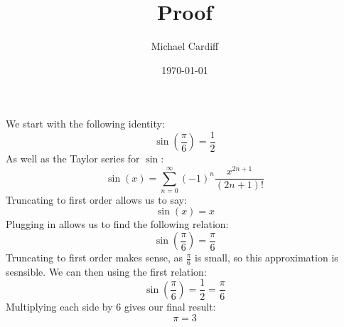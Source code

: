 \documentclass[12pt]{article}
\title{Proof}
\author{Michael Cardiff}
\date{\today}
\begin{document}
\maketitle
We start with the following identity:
\begin{equation}
  \sin(\frac{\pi}{6})=\frac{1}{2}
\end{equation}
As well as the Taylor series for $\sin$:
\begin{equation}
  \sin(x)=\sum_{n=0}^\infty(-1)^{n}\frac{x^{2n+1}}{(2n+1)!}
\end{equation}
Truncating to first order allows us to say:
\begin{equation}
  \sin(x)=x
\end{equation}
Plugging in allows us to find the following relation:
\begin{equation}
  \sin(\frac{\pi}{6})=\frac{\pi}{6}
\end{equation}
Truncating to first order makes sense, as $\frac{\pi}{6}$ is small, so this approximation is sesnsible. We can then using the first relation:
\begin{equation}
  \sin(\frac{\pi}{6})=\frac{1}{2}=\frac{\pi}{6}
\end{equation}
Multiplying each side by 6 gives our final result:
\begin{equation}
  \pi=3
\end{equation}
\end{document}
